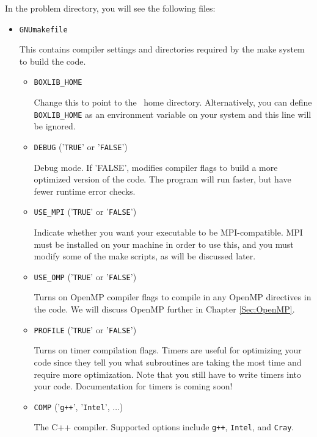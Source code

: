 In the problem directory, you will see the following files:
\begin{itemize}
\item {\tt GNUmakefile}

This contains compiler settings and directories required by the make system to build the code.

  \begin{itemize}

    \item {\tt BOXLIB\_HOME}

    Change this to point to the \BoxLib\ home directory.  Alternatively, you can define {\tt BOXLIB\_HOME}
    as an environment variable on your system and this line will be ignored.

    \item {\tt DEBUG} ('{\tt TRUE}' or '{\tt FALSE}')
      
    Debug mode.  If 'FALSE', modifies compiler flags to build a more optimized version of the code.
    The program will run faster, but have fewer runtime error checks.

    \item {\tt USE\_MPI} ('{\tt TRUE}' or '{\tt FALSE}')

    Indicate whether you want your executable to be MPI-compatible.  MPI must be installed on your
    machine in order to use this, and you must modify some of the make scripts, as will be 
    discussed later.

    \item {\tt USE\_OMP} ('{\tt TRUE}' or '{\tt FALSE}')
    
    Turns on OpenMP compiler flags to compile in any OpenMP directives in the code.
    We will discuss OpenMP further in Chapter \ref{Sec:OpenMP}.

    \item {\tt PROFILE} ('{\tt TRUE}' or '{\tt FALSE}')

    Turns on timer compilation flags.  Timers are useful for optimizing your code since they tell you 
    what subroutines are taking the most time and require more optimization.  Note that you still have 
    to write timers into your code.  Documentation for timers is coming soon!

    \item {\tt COMP} ('{\tt g++}', '{\tt Intel}', $\ldots$)

    The C++ compiler.  Supported options include {\tt g++}, {\tt Intel}, and
    {\tt Cray}.


\end{itemize}
\end{itemize}

